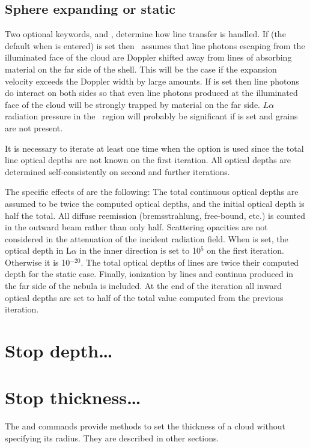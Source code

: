 \subsection{Sphere expanding or static}

Two optional keywords,
 and ,
determine how line transfer
is handled.
If  (the default when
 is entered) is set then
\Cloudy\ assumes that line photons escaping
from the illuminated face of the
cloud are Doppler shifted away from lines of
absorbing material on the far
side of the shell.
This will be the case if the expansion velocity exceeds
the Doppler width by large amounts.
If  is set then line photons
do interact on both sides so that even line photons produced at the
illuminated face of the cloud will be strongly trapped by material on the
far side.
$L\alpha $ radiation pressure in the \hplus\ region will probably be
significant if  is set and grains are not present.

It is necessary to iterate at least one time when
the  option is
used since the total line optical depths are not known on the first
iteration.
All optical depths are determined self-consistently on second
and further iterations.

The specific effects of  are the following:
The total continuous
optical depths are assumed to be twice the computed optical depths, and
the initial optical depth is half the total.
All diffuse reemission
(bremsstrahlung, free-bound, etc.) is counted in the outward beam
rather than only half.
Scattering opacities are not considered in the attenuation
of the incident radiation field.
When  is set, the optical depth
in L$\alpha$ in the inner direction is set to 10$^5$ on the first iteration.
Otherwise it is 10$^{-20}$.
The total optical depths of lines are twice their computed
depth for the static case.
Finally, ionization by lines and continua
produced in the far side of the nebula is included.
At the end of the
iteration all inward optical depths are set to half of the total value
computed from the previous iteration.

\section{Stop depth\dots}

\section{Stop thickness\dots}

The  and  commands
provide methods to set the thickness of a cloud without
specifying its radius.
They are described in other sections.






